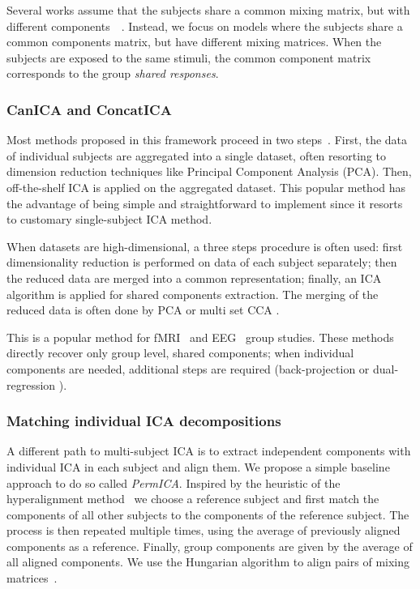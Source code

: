 Several works assume that the subjects share a common mixing matrix, but with different components~\cite{pfister2019robustifying}~\cite{svensen2002ica}.
% 
Instead, we focus on models where the subjects share a common components matrix, but have different mixing matrices.
When the subjects are exposed to the same stimuli, the common component matrix corresponds to the group \emph{shared responses}.

\subsubsection{CanICA and ConcatICA}
\label{sec:canicaandconcatica}
Most methods proposed in this framework proceed in two steps~\cite{calhoun2009review, huster2015group}.
% 
First, the data of individual subjects are aggregated into a single dataset, often resorting to dimension reduction techniques like Principal Component Analysis (PCA).
% 
Then, off-the-shelf ICA is applied on the aggregated dataset.
% 
This popular method has the advantage of being simple and
straightforward to implement since it resorts to customary single-subject
ICA method.

% 
\cite{varoquaux2009canica}
When datasets are high-dimensional, a three steps procedure is often used: first dimensionality reduction is performed on data of each subject  separately; then the reduced data are merged into a common representation; finally, an ICA algorithm is applied for shared components extraction. The merging of the reduced data is often done by PCA \cite{calhoun2001method} or multi set CCA \cite{varoquaux2009canica}.

This is a popular method for fMRI~\cite{calhoun2009review} and EEG~\cite{eichele2011eegift} group studies.
These methods directly recover only group level, shared components; when individual components are needed, additional steps are required (back-projection \cite{calhoun2001method} or dual-regression \cite{beckmann2009group}).
% 

\subsubsection{Matching individual ICA decompositions}
\label{sec:permica}
A different path to multi-subject ICA is to extract independent components with individual ICA in each subject and align them. We propose a simple baseline approach to do so called \emph{PermICA}.
Inspired by the heuristic of the hyperalignment method~\cite{haxby2011common} we choose a reference subject and first match the components of all other subjects to the components of the reference subject. The process is then repeated multiple times, using the average of previously aligned components as a reference. Finally, group components are given by the average of all aligned components. We use the Hungarian algorithm to align pairs of mixing matrices~\cite{tichavsky2004optimal}.

